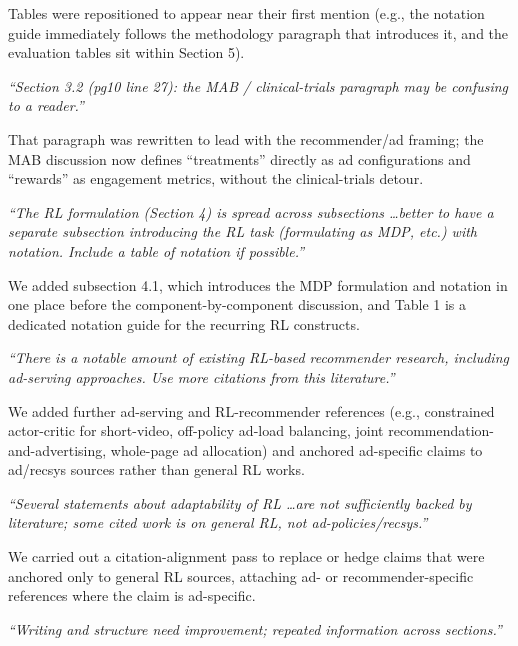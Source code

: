 \documentclass[11pt]{article}
\newenvironment{revcomment}
  {\par\smallskip\noindent\begin{list}{}{%
      \setlength{\leftmargin}{1.5em}\setlength{\rightmargin}{1em}}%
   \item\itshape\color{black!75}}
  {\end{list}\par\smallskip}
\begin{document}
Tables were repositioned to appear near their first mention (e.g., the notation
guide immediately follows the methodology paragraph that introduces it, and the
evaluation tables sit within Section 5).

\begin{revcomment}
``Section 3.2 (pg10 line 27): the MAB / clinical-trials paragraph may be
confusing to a reader.''
\end{revcomment}

That paragraph was rewritten to lead with the recommender/ad framing; the MAB
discussion now defines ``treatments'' directly as ad configurations and
``rewards'' as engagement metrics, without the clinical-trials detour.

\begin{revcomment}
``The RL formulation (Section 4) is spread across subsections \dots better to
have a separate subsection introducing the RL task (formulating as MDP, etc.)
with notation. Include a table of notation if possible.''
\end{revcomment}

We added subsection 4.1, which introduces the MDP formulation and notation in
one place before the component-by-component discussion, and Table 1 is a
dedicated notation guide for the recurring RL constructs.

\begin{revcomment}
``There is a notable amount of existing RL-based recommender research, including
ad-serving approaches. Use more citations from this literature.''
\end{revcomment}

We added further ad-serving and RL-recommender references (e.g., constrained
actor-critic for short-video, off-policy ad-load balancing, joint
recommendation-and-advertising, whole-page ad allocation) and anchored
ad-specific claims to ad/recsys sources rather than general RL works.

\begin{revcomment}
``Several statements about adaptability of RL \dots are not sufficiently backed
by literature; some cited work is on general RL, not ad-policies/recsys.''
\end{revcomment}

We carried out a citation-alignment pass to replace or hedge claims that were
anchored only to general RL sources, attaching ad- or recommender-specific
references where the claim is ad-specific.

\begin{revcomment}
``Writing and structure need improvement; repeated information across
sections.''
\end{revcomment}
\end{document}
